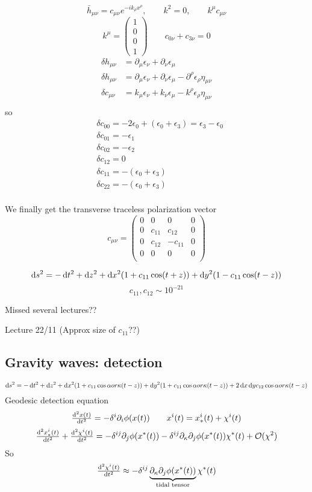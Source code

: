 \[\bar{h}_{\mu\nu} = c_{\mu\nu}e^{-ik_\rho x^\rho}, \qquad k^2 =0, \qquad k^\mu c_{\mu\nu}\]
\[ k^\mu = \begin{pmatrix}
1\\0\\0\\1
\end{pmatrix} \qquad c_{0\nu}+c_{3\nu} = 0 \]
\begin{align*}
\delta h_{\mu\nu} &= \partial_\mu \epsilon_\nu + \partial_\nu\epsilon_\mu \\
\delta h_{\mu\nu} &= \partial_\mu \epsilon_\nu + \partial_\nu\epsilon_\mu - \partial^\rho\epsilon_\rho\eta_{\mu\nu} \\
\delta c_{\mu\nu} &= k_\mu \epsilon_\nu + k_\nu\epsilon_\mu - k^\rho\epsilon_\rho\eta_{\mu\nu} \\
\end{align*}
so
\begin{align*}
&\delta c_{00} = -2\epsilon_0+ (\epsilon_0+\epsilon_3) = \epsilon_3-\epsilon_0 \\
&\delta c_{01} = -\epsilon_1 \\
&\delta c_{02} = -\epsilon_2 \\
&\delta c_{12} = 0 \\
&\delta c_{11} = -(\epsilon_0+\epsilon_3) \\
&\delta c_{22} = -(\epsilon_0+\epsilon_3) \\
\end{align*}

We finally get the transverse traceless polarization vector
\[c_{\mu\nu} = \begin{pmatrix}
0 &0&0&0 \\
0&c_{11}&c_{12} & 0\\
0&c_{12}&-c_{11}&0 \\
0 &0&0&0 \\
\end{pmatrix}\]

\[ \operatorname{d \!}{s}^2 = - \operatorname{d \!}{t}^2 + \operatorname{d \!}{z}^2 + \operatorname{d \!}{x}^2(1+c_{11}\cos(t+z))+\operatorname{d \!}{y}^2(1-c_{11}\cos(t-z)) \]
\[ c_{11}, c_{12} \sim 10^{-21} \]

Missed several lectures??

Lecture 22/11
(Approx size of $c_{11}$??)

\subsection{Gravity waves: detection}
\[ \operatorname{d \!}{s}^2 =  - \operatorname{d \!}{t}^2 + \operatorname{d \!}{z}^2 + \operatorname{d \!}{x}^2(1+c_{11}\cos \alpha or \kappa (t-z)) + \operatorname{d \!}{y}^2(1+c_{11}\cos \alpha or \kappa (t-z)) + 2 \operatorname{d \!}{x} \operatorname{d \!}{y} c_{12}\cos \alpha or \kappa (t-z)\]
Geodesic detection equation
\[ \od[2]{x(t)}{t} = -\delta^i\partial_i \phi(x(t)) \qquad x^i(t) = x_*^i(t) + \chi^i(t) \]
\[ \od[2]{x^i_*(t)}{t} + \od[2]{\chi^i(t)}{t} = -\delta^{ij}\partial_j\phi(x^*(t)) - \delta^{ij}\partial_\kappa\partial_j\phi(x^*(t))\chi^*(t) + \mathcal{O}(\chi^2) \]
So
\[ \od[2]{\chi^i(t)}{t} \approx - \delta^{ij}\underbrace{\partial_\kappa\partial_j\phi(x^*(t))}_{\text{tidal tensor}}\chi^*(t) \]

